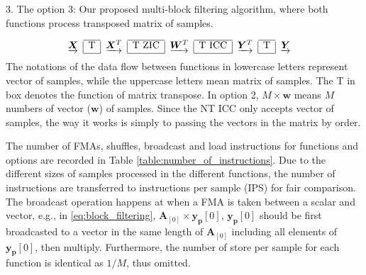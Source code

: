 3. The option 3: Our proposed multi-block filtering algori\-thm, where both functions process transposed matrix of samples. 

\begin{equation*}
    \label{eq:option_3}
    \begin{aligned}
        & \begin{array}{c|c|c|c|c|c|c|c|c}
            \cline{2-2}
            \cline{4-4}
            \cline{6-6}
            \cline{8-8}
            \underrightarrow{\bm{X}} & \text{T} & \underrightarrow{\bm{X}^T} & \text{T ZIC} & \underrightarrow{\bm{W}^T} & \text{T ICC} & \underrightarrow{\bm{Y}^T} & \text{T} & \underrightarrow{\bm{Y}} \\
            \cline{2-2}
            \cline{4-4}
            \cline{6-6}
            \cline{8-8}
    \end{array}
\end{aligned}
\end{equation*}
The notations of the data flow between functions in lowercase letters represent vector of samples,
while the uppercase letters mean matrix of samples. The T in box denotes the function of matrix transpose.
In option 2, $M \times \bm{w}$ means $M$ numbers of vector ($\bm{w}$) of samples.
Since the NT ICC only accepts vector of samples, the way it works is simply to passing the vectors in the matrix by order.


The number of FMAs, shuffles, broadcast and load instru\-ctions for functions 
and options are recorded in Table \ref{table:number_of_instructions}.
Due to the different sizes of samples processed in the different functions, 
the number of instructions are transferred to instructions per sample (IPS) for fair comparison.
The broadcast operation happens at when a FMA is taken between a scalar and vector, e.g.,
in \eqref{eq:block_filtering}, $\bm{A}_{[0]} \times \bm{y_p}[0]$, $\bm{y_p}[0]$ should be first broadcasted to
a vector in the same length of $\bm{A}_{[0]}$ including all elements of $\bm{y_p}[0]$, then multiply.
Furthermore, the number of store per sample for each function is identical as $1/M$, thus omitted. 

